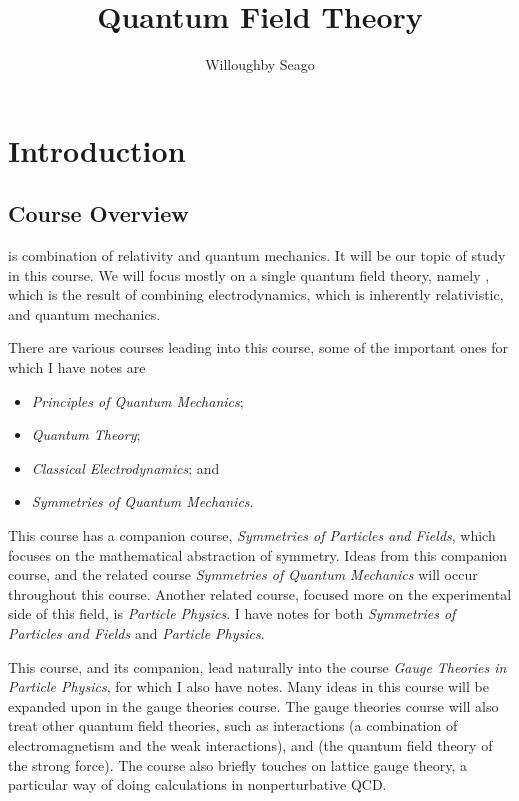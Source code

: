 \documentclass[fleqn]{NotesClass}
\title{Quantum Field Theory}
\author{Willoughby Seago}
\date{}
\newcommand*{\course}[1]{\textit{#1}}
\begin{document}
    \frontmatter
    \titlepage
    \innertitlepage{}
    \tableofcontents
    \listoffigures
    \mainmatter
    
    \chapter{Introduction}
    \section{Course Overview}
     is combination of relativity and quantum mechanics.
    It will be our topic of study in this course.
    We will focus mostly on a single quantum field theory, namely , which is the result of combining electrodynamics, which is inherently relativistic, and quantum mechanics.
    
    There are various courses leading into this course, some of the important ones for which I have notes are
    \begin{itemize}
        \item \course{Principles of Quantum Mechanics};
        \item \course{Quantum Theory};
        \item \course{Classical Electrodynamics}; and
        \item \course{Symmetries of Quantum Mechanics}.
    \end{itemize}
    This course has a companion course, \course{Symmetries of Particles and Fields}, which focuses on the mathematical abstraction of symmetry.
    Ideas from this companion course, and the related course \course{Symmetries of Quantum Mechanics} will occur throughout this course.
    Another related course, focused more on the experimental side of this field, is \course{Particle Physics}.
    I have notes for both \course{Symmetries of Particles and Fields} and \course{Particle Physics}.
    
    This course, and its companion, lead naturally into the course \course{Gauge Theories in Particle Physics}, for which I also have notes.
    Many ideas in this course will be expanded upon in the gauge theories course.
    The gauge theories course will also treat other quantum field theories, such as  interactions (a combination of electromagnetism and the weak interactions), and  (the quantum field theory of the strong force).
    The course also briefly touches on lattice gauge theory, a particular way of doing calculations in nonperturbative QCD.
    
\end{document}
